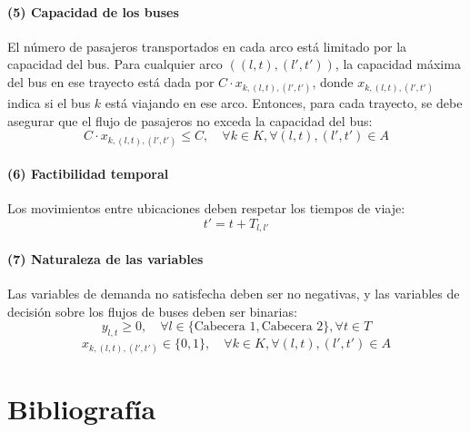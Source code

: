\documentclass[preprint,11pt]{elsarticle}
\begin{document}
\paragraph{(5) Capacidad de los buses}
El número de pasajeros transportados en cada arco está limitado por la capacidad del bus. Para cualquier arco $((l,t), (l', t'))$, la capacidad máxima del bus en ese trayecto está dada por $C \cdot x_{k,(l,t),(l',t')}$, donde $x_{k,(l,t),(l',t')}$ indica si el bus $k$ está viajando en ese arco. Entonces, para cada trayecto, se debe asegurar que el flujo de pasajeros no exceda la capacidad del bus:
\[
C \cdot x_{k,(l,t),(l',t')} \leq C, \quad \forall k \in K, \forall (l,t),(l',t') \in A
\]


\paragraph{(6) Factibilidad temporal}
Los movimientos entre ubicaciones deben respetar los tiempos de viaje:
\[
t' = t + T_{l,l'}
\]


\paragraph{(7) Naturaleza de las variables}
Las variables de demanda no satisfecha deben ser no negativas, y las variables de decisión sobre los flujos de buses deben ser binarias:
\[
y_{l,t} \geq 0, \quad \forall l \in \{\text{Cabecera 1}, \text{Cabecera 2}\}, \forall t \in T
\]
\[
x_{k,(l,t),(l',t')} \in \{0,1\}, \quad \forall k \in K, \forall (l,t),(l',t') \in A
\]


\section{Bibliografía}
\printbibliography %
\end{document}
